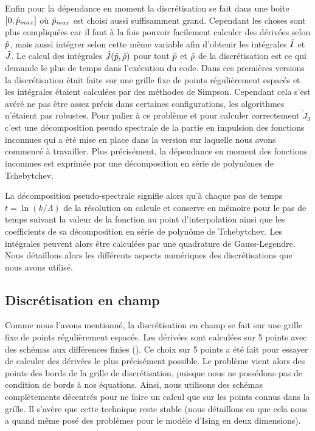 \documentclass[10.5pt]{article}
\begin{document}
\begin{multicols*}{2}
Enfin pour la dépendance en moment la discrétisation se fait dans une boite $[0, \tilde{p}_{max}]$ où $\tilde{p}_{max}$ est choisi aussi suffisamment grand. Cependant les choses sont plus compliquées car il faut à la fois pouvoir facilement calculer des dérivées selon $\tilde{p}$, mais aussi intégrer selon cette même variable afin d'obtenir les intégrales $\tilde{I}$ et $\tilde{J}$.  Le calcul des intégrales $\tilde{J}(\tilde{p}, \tilde{\rho})$ pour tout $\tilde{p}$ et $\tilde{\rho}$ de la discrétisation est ce qui demande le plus de temps dans l'exécution du code. Dans ces premières versions la discrétisation était faite sur une grille fixe de points régulièrement espacés et les intégrales étaient calculées par des méthodes de Simpson. Cependant cela s'est avéré ne pas être assez précis dans certaines configurations, les algorithmes n'étaient pas robustes. Pour palier à ce problème et pour calculer correctement $\tilde J_3$ c'est une décomposition pseudo spectrale de la partie en impulsion des fonctions inconnues qui a été mise en place dans la version sur laquelle nous avons commencé à travailler. Plus précisément, la dépendance en moment des fonctions inconnues est exprimée par une décomposition en série de polynômes de Tchebytchev. 

La décomposition pseudo-spectrale signifie alors qu'à chaque pas de temps $t=\ln(k/\Lambda)$ de la résolution on calcule et conserve en mémoire pour le pas de temps suivant la valeur de la fonction au point d'interpolation ainsi que les coefficients de sa décomposition en série de polynôme de Tchebytchev. Les intégrales peuvent alors être calculées par une quadrature de Gauss-Legendre. \\

Nous détaillons alors les différents aspects numériques des discrétisations que nous avons utilisé.




\subsection{Discrétisation en champ}

Comme nous l'avons mentionné, la discrétisation en champ se fait sur une grille fixe de points régulièrement espacés. Les dérivées sont calculées sur 5 points avec des schémas aux différences finies (). Ce choix sur 5 points  a été fait pour essayer de calculer des dérivées le plus précisément possible. Le problème vient alors des points des bords de la grille de discrétisation, puisque nous ne possédons pas de condition de bords à nos équations. Ainsi, nous utilisons des schémas complètements décentrés pour ne faire un calcul que sur les points connus dans la grille. Il s'avère que cette technique reste stable (nous détaillons en  que cela nous a quand même posé des problèmes pour le modèle d'Ising en deux dimensions). \\


\end{multicols*}
\end{document}
